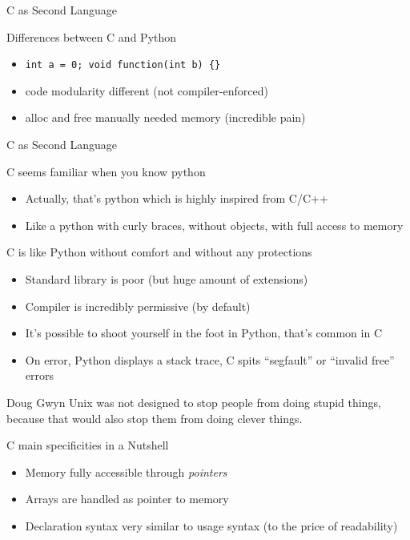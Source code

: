 \begin{frame}{C as Second Language}
  \begin{block}{Differences between C and Python}
    \begin{itemize}
    \item {} \texttt{int a = 0; void
        function(int b) \{\}} 
    \item {} code modularity different
      {\small(not compiler-enforced)}
    \item {} alloc and free manually needed
      memory {\small(incredible pain)}
    \end{itemize}
  \end{block}
\end{frame}
\begin{frame}[squeeze]{C as Second Language}
  \begin{block}{C seems familiar when you know python}
    \begin{itemize}
    \item Actually, that's python which is highly inspired from C/C++
    \item Like a python with curly braces, without objects, with full
      access to memory
    \end{itemize}
  \end{block}

  \begin{block}{C is like Python without comfort and without any protections}
    \begin{itemize}
    \item Standard library is poor (but huge amount of extensions)
    \item Compiler is incredibly permissive (by default)
    \item It's possible to shoot yourself in the foot in Python,
      that's common in C
    \item On error, Python displays a stack trace, C spits ``segfault'' or
      ``invalid free'' errors
    \end{itemize}
  \end{block}
  
  \begin{boitequote}{Doug Gwyn}
    Unix was not designed to stop people from doing stupid things, because
    that would also stop them from doing clever things.
  \end{boitequote}
  \begin{block}{C main specificities in a Nutshell}
    \begin{itemize}
    \item Memory fully accessible through \textit{pointers}
    \item Arrays are handled as pointer to memory
    \item Declaration syntax very similar to usage syntax (to the price of
      readability)
    \end{itemize}
  \end{block}
\end{frame}

